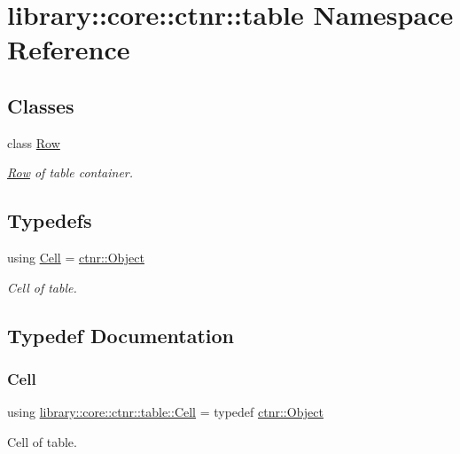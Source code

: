 \hypertarget{namespacelibrary_1_1core_1_1ctnr_1_1table}{}\section{library\+::core\+::ctnr\+::table Namespace Reference}
\label{namespacelibrary_1_1core_1_1ctnr_1_1table}
\subsection*{Classes}
\begin{DoxyCompactItemize}
\item 
class \mbox{\hyperlink{classlibrary_1_1core_1_1ctnr_1_1table_1_1_row}{Row}}
\begin{DoxyCompactList}\small\item\em \mbox{\hyperlink{classlibrary_1_1core_1_1ctnr_1_1table_1_1_row}{Row}} of table container. \end{DoxyCompactList}\end{DoxyCompactItemize}
\subsection*{Typedefs}
\begin{DoxyCompactItemize}
\item 
using \mbox{\hyperlink{namespacelibrary_1_1core_1_1ctnr_1_1table_aac6007d595b2967513e8e6b89f6092f5}{Cell}} = \mbox{\hyperlink{classlibrary_1_1core_1_1ctnr_1_1_object}{ctnr\+::\+Object}}
\begin{DoxyCompactList}\small\item\em Cell of table. \end{DoxyCompactList}\end{DoxyCompactItemize}


\subsection{Typedef Documentation}
\mbox{\label{namespacelibrary_1_1core_1_1ctnr_1_1table_aac6007d595b2967513e8e6b89f6092f5}} 
\subsubsection{\texorpdfstring{Cell}{Cell}}
{\footnotesize\ttfamily using \mbox{\hyperlink{namespacelibrary_1_1core_1_1ctnr_1_1table_aac6007d595b2967513e8e6b89f6092f5}{library\+::core\+::ctnr\+::table\+::\+Cell}} = typedef \mbox{\hyperlink{classlibrary_1_1core_1_1ctnr_1_1_object}{ctnr\+::\+Object}}}



Cell of table. 

